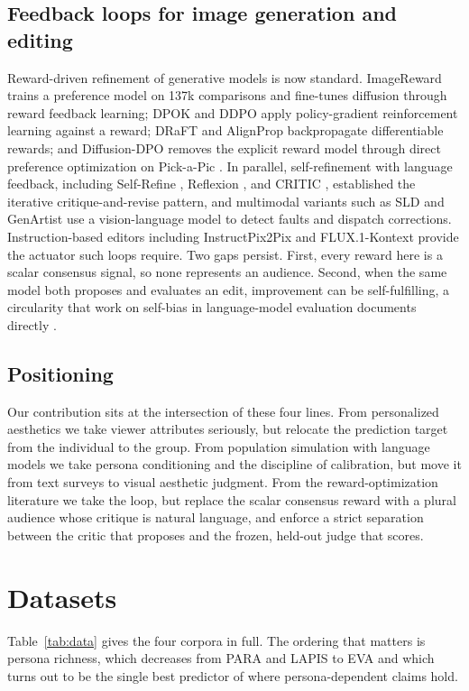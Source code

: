\documentclass{article}
\begin{document}
\subsection{Feedback loops for image generation and editing}
Reward-driven refinement of generative models is now standard. ImageReward \citep{xu2023imagereward} trains a preference model on 137k comparisons and fine-tunes diffusion through reward feedback learning; DPOK \citep{fan2023dpok} and DDPO \citep{black2024ddpo} apply policy-gradient reinforcement learning against a reward; DRaFT \citep{clark2024draft} and AlignProp \citep{prabhudesai2023alignprop} backpropagate differentiable rewards; and Diffusion-DPO \citep{wallace2024dpo} removes the explicit reward model through direct preference optimization on Pick-a-Pic \citep{kirstain2023pickapic}. In parallel, self-refinement with language feedback, including Self-Refine \citep{madaan2023selfrefine}, Reflexion \citep{shinn2023reflexion}, and CRITIC \citep{gou2024critic}, established the iterative critique-and-revise pattern, and multimodal variants such as SLD \citep{wu2024sld} and GenArtist \citep{wang2024genartist} use a vision-language model to detect faults and dispatch corrections. Instruction-based editors including InstructPix2Pix \citep{brooks2023instructpix2pix} and FLUX.1-Kontext \citep{flux2024} provide the actuator such loops require. Two gaps persist. First, every reward here is a scalar consensus signal, so none represents an audience. Second, when the same model both proposes and evaluates an edit, improvement can be self-fulfilling, a circularity that work on self-bias in language-model evaluation documents directly \citep{xu2024selfbias}.

\subsection{Positioning}
Our contribution sits at the intersection of these four lines. From personalized aesthetics we take viewer attributes seriously, but relocate the prediction target from the individual to the group. From population simulation with language models we take persona conditioning and the discipline of calibration, but move it from text surveys to visual aesthetic judgment. From the reward-optimization literature we take the loop, but replace the scalar consensus reward with a plural audience whose critique is natural language, and enforce a strict separation between the critic that proposes and the frozen, held-out judge that scores.


\section{Datasets}
Table~\ref{tab:data} gives the four corpora in full. The ordering that matters is persona richness, which decreases from PARA and LAPIS to EVA and which turns out to be the single best predictor of where persona-dependent claims hold.
\end{document}
